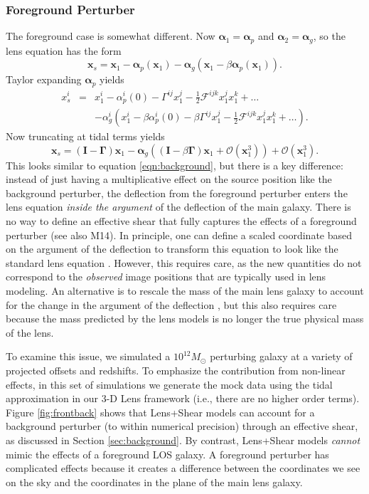 \documentclass{emulateapj}
\newcommand\I[0]{\mathbf{I}}
\newcommand\GammaMat[0]{\boldsymbol{\Gamma}}
\newcommand\x[0]{\mathbf{x}}
\newcommand\al[0]{\boldsymbol{\alpha}}
\newcommand\sF{{\mathcal F}}
\begin{document}
\subsubsection{Foreground Perturber}
\label{sec:foreground}

The foreground case is somewhat different. Now $\al_1 = \al_p$ and $\al_2 = \al_g$, so the lens equation has the form
\begin{equation}
\x_s =\x_1 - \al_p(\x_1) - \al_g(\x_1 - \beta \al_p(\x_1)).
\end{equation}
Taylor expanding $\al_p$ yields
\begin{eqnarray}
x^i_s &=& x^i_1  - \alpha_p^i(0) - \Gamma^{ij}x^j_1 - \frac{1}{2} \sF^{ijk} x^j_1 x^k_1 +\ldots \\
&& - \alpha^i_g \left(x^i_1 - \beta\alpha_p^i(0) - \beta \Gamma^{ij} x^j_1 - \frac{1}{2} \sF^{ijk} x^j_1 x^k_1 + \ldots \right). \nonumber
\end{eqnarray}
Now truncating at tidal terms yields
\begin{equation}
\x_s = (\I - \GammaMat) \x_1 - \al_g\left((\I - \beta\GammaMat) \x_1 + \mathcal{O}(\x_1^3)\right) + \mathcal{O}(\x_1^3).
\end{equation}
This looks similar to equation \ref{eqn:background}, but there is a key difference: instead of just having a multiplicative effect on the source position like the background perturber, the deflection from the foreground perturber enters the lens equation \emph{inside the argument} of the deflection of the main galaxy. There is no way to define an effective shear that fully captures the effects of a foreground perturber (see also M14).  In principle, one can define a scaled coordinate based on the argument of the deflection to transform this equation to look like the standard lens equation \citep[e.g.,][]{Schneider97,Keeton03}. However, this requires care, as the new quantities do not correspond to the \emph{observed} image positions that are typically used in lens modeling. An alternative is to rescale the mass of the main lens galaxy to account for the change in the argument of the deflection \citep{Schneider97}, but this also requires care because the mass predicted by the lens models is no longer the true physical mass of the lens.

To examine this issue, we simulated a $10^{12} M_\odot$ perturbing galaxy at a variety of projected offsets and redshifts. To emphasize the contribution from non-linear effects, in this set of simulations we generate the mock data using the tidal approximation in our 3-D Lens framework (i.e., there are no higher order terms).  Figure \ref{fig:frontback} shows that Lens+Shear models can account for a background perturber (to within numerical precision) through an effective shear, as discussed in Section \ref{sec:background}.  By contrast, Lens+Shear models \emph{cannot} mimic the effects of a foreground LOS galaxy.  A foreground perturber has complicated effects because it creates a difference between the coordinates we see on the sky and the coordinates in the plane of the main lens galaxy.
\end{document}
